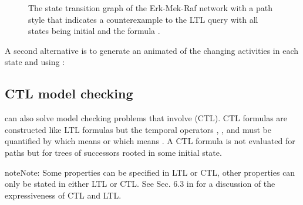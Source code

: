 \documentclass[letterpaper,10pt,english]{sphinxmanual}
\begin{document}
\begin{figure}[htbp]
\centering
\capstart

\noindent{}
\caption{The state transition graph  of the Erk-Mek-Raf network with a path style that indicates a counterexample to
the LTL query with all states being initial and the formula .}\label{\detokenize{Manual:figure19}}\label{\detokenize{Manual:id23}}\end{figure}

A second alternative is to generate an animated  of the changing activities in each state
and using {\hyperref[\detokenize{InteractionGraphs:activities2animation}]{}}:

\begin{sphinxVerbatim}[commandchars=\\\{\}]
  
  
\end{sphinxVerbatim}


\subsection{CTL model checking}
\label{\detokenize{Manual:ctl-model-checking}}
{\hyperref[\detokenize{Installation:installation-nusmv}]{}} can also solve model checking problems that involve  (CTL).
CTL formulas are constructed like LTL formulas but the temporal operators , ,  and  must be quantified by  which means 
or  which means .
A CTL formula is not evaluated for paths but for trees of successors rooted in some initial state.

\begin{sphinxadmonition}{note}{Note:}
Some properties can be specified in LTL or CTL, other properties can only be stated in either LTL or CTL.
See Sec. 6.3 in {\hyperref[\detokenize{Bibliography:baier2008}]{}} for a discussion of the expressiveness of CTL and LTL.
\end{sphinxadmonition}
\end{document}
